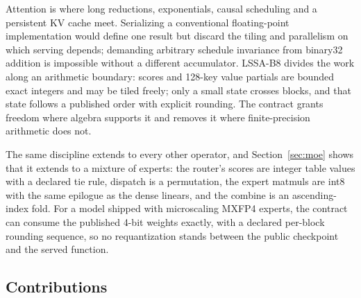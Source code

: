 \documentclass{article}
\begin{document}
Attention is where long reductions, exponentials, causal scheduling and a persistent KV
cache meet.  Serializing a conventional floating-point implementation would define one
result but discard the tiling and parallelism on which serving depends; demanding arbitrary
schedule invariance from binary32 addition is impossible without a different accumulator.
LSSA-B8 divides the work along an arithmetic boundary: scores and 128-key value partials are
bounded exact integers and may be tiled freely; only a small state crosses blocks, and that
state follows a published order with explicit rounding.  The contract grants freedom where
algebra supports it and removes it where finite-precision arithmetic does not.

The same discipline extends to every other operator, and Section~\ref{sec:moe} shows that it
extends to a mixture of experts: the router's scores are integer table values with a declared
tie rule, dispatch is a permutation, the expert matmuls are int8 with the same epilogue as the
dense linears, and the combine is an ascending-index fold.  For a model shipped with
microscaling MXFP4 experts, the contract can consume the published 4-bit weights exactly,
with a declared per-block rounding sequence, so no requantization stands between the public
checkpoint and the served function.

\subsection{Contributions}
\end{document}
